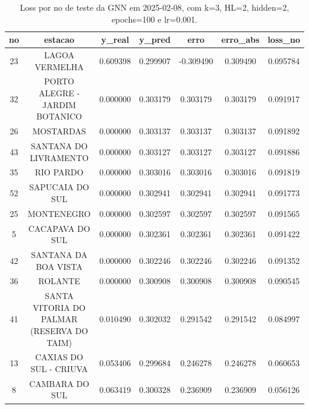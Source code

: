 \begin{table}[h]
\centering
\caption{Loss por no de teste da GNN em 2025-02-08, com k=3, HL=2, hidden=2, epochs=100 e lr=0.001.}
\label{tab:gnn_loss_k3_hl2_h2_e100_d20250208}
\begin{tabular}{ccccccc}
\toprule
no & estacao & y\_real & y\_pred & erro & erro\_abs & loss\_no \\
\midrule
23 & LAGOA VERMELHA & 0.609398 & 0.299907 & -0.309490 & 0.309490 & 0.095784 \\
32 & PORTO ALEGRE - JARDIM BOTANICO & 0.000000 & 0.303179 & 0.303179 & 0.303179 & 0.091917 \\
26 & MOSTARDAS & 0.000000 & 0.303137 & 0.303137 & 0.303137 & 0.091892 \\
43 & SANTANA DO LIVRAMENTO & 0.000000 & 0.303127 & 0.303127 & 0.303127 & 0.091886 \\
35 & RIO PARDO & 0.000000 & 0.303016 & 0.303016 & 0.303016 & 0.091819 \\
52 & SAPUCAIA DO SUL & 0.000000 & 0.302941 & 0.302941 & 0.302941 & 0.091773 \\
25 & MONTENEGRO & 0.000000 & 0.302597 & 0.302597 & 0.302597 & 0.091565 \\
5 & CACAPAVA DO SUL & 0.000000 & 0.302361 & 0.302361 & 0.302361 & 0.091422 \\
42 & SANTANA DA BOA VISTA & 0.000000 & 0.302246 & 0.302246 & 0.302246 & 0.091352 \\
36 & ROLANTE & 0.000000 & 0.300908 & 0.300908 & 0.300908 & 0.090545 \\
41 & SANTA VITORIA DO PALMAR (RESERVA DO TAIM) & 0.010490 & 0.302032 & 0.291542 & 0.291542 & 0.084997 \\
13 & CAXIAS DO SUL - CRIUVA & 0.053406 & 0.299684 & 0.246278 & 0.246278 & 0.060653 \\
8 & CAMBARA DO SUL & 0.063419 & 0.300328 & 0.236909 & 0.236909 & 0.056126 \\
\bottomrule
\end{tabular}
\end{table}

